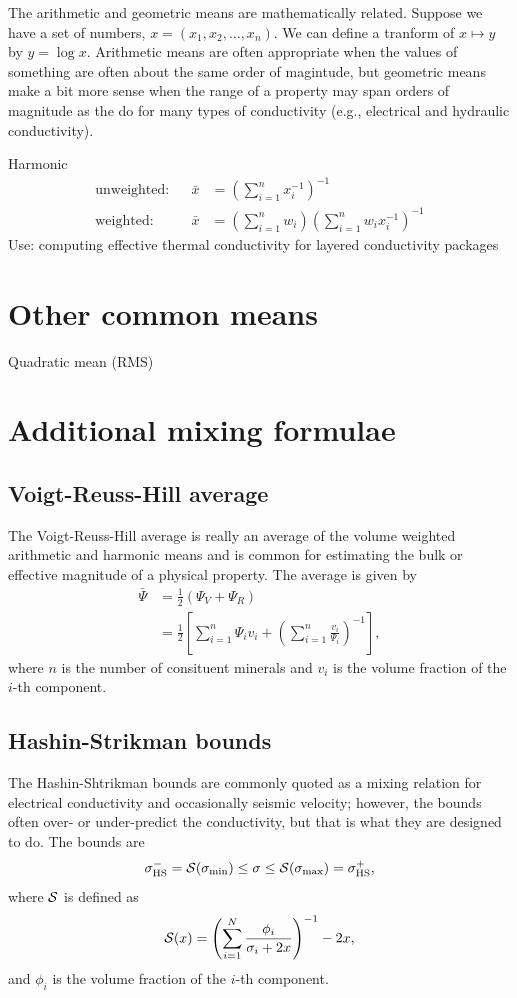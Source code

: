 \documentclass[final,a4paper,12pt]{article}
\theoremstyle{definition}
\begin{document}
The arithmetic and geometric means are mathematically related.  Suppose we have
a set of numbers, $x = (x_1, x_2, \ldots, x_n)$.  We can define a tranform of
$x \mapsto y$ by $y = \log x$.  Arithmetic means
are often appropriate when the values of something are often about the same
order of magintude, but geometric means make a bit more sense when the range of
a property may span orders of magnitude as the do for many types of conductivity
(e.g., electrical and hydraulic conductivity).

Harmonic
\begin{align}
    \text{unweighted:} && \bar{x} &= \left( \sum_{i=1}^{n} x_i^{-1} \right)^{-1} \\
    \text{weighted:} && \bar{x} &= \left( \sum_{i=1}^{n} w_i \right)
        \left( \sum_{i=1}^{n} w_i x_i^{-1} \right)^{-1}
\end{align}
Use: computing effective thermal conductivity for layered conductivity packages

\section{Other common means}
Quadratic mean (RMS)

\section{Additional mixing formulae}
\subsection{Voigt-Reuss-Hill average}
The Voigt-Reuss-Hill average is really an average of the volume weighted
arithmetic and harmonic means and is common for estimating the bulk or effective
magnitude of a physical property.  The average is given by
\begin{align}
    \bar{\Psi} &= \frac{1}{2}(\Psi_V + \Psi_R) \\
    &= \frac{1}{2}\left[
    \sum_{i = 1}^n \Psi_i v_i +
    \left( \sum_{i = 1}^n \frac{v_i}{\Psi_i} \right)^{-1}
    \right],
\end{align}
where $n$ is the number of consituent minerals and $v_i$ is the volume fraction
of the $i$-th component.

\subsection{Hashin-Strikman bounds}
The Hashin-Shtrikman bounds are commonly quoted as a mixing relation for
electrical conductivity and occasionally seismic velocity; however, the bounds
often over- or under-predict the conductivity, but that is what they are
designed to do.  The bounds are
\begin{equation}
    \sigma_{\text{HS}}^- = \mathcal{S}(\sigma_{\text{min}}) \leq \sigma \leq
    \mathcal{S}(\sigma_{\text{max}}) = \sigma_{\text{HS}}^+,
\end{equation}
where $\mathcal{S}$ is defined as
\begin{equation}
    \mathcal{S}(x) =
    \Biggl( \sum_{i=1}^N \frac{\phi_i}{\sigma_i + 2x} \Biggr)^{-1} - 2x ,
\end{equation}
and $\phi_i$ is the volume fraction of the $i$-th component.
\end{document}
